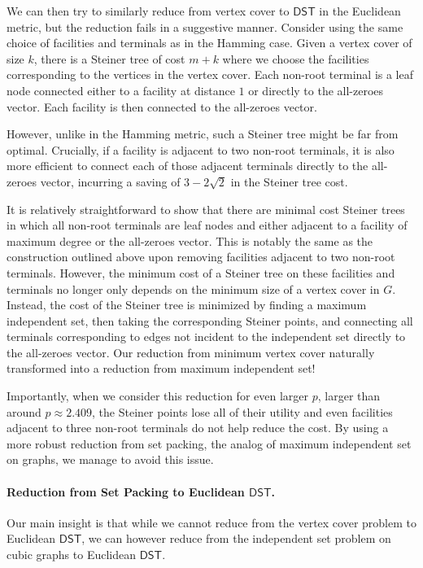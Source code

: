 \documentclass{theoretics}
\newcommand{\1}{\textbf{1}}
\newcommand{\dst}{$\mathsf{DST}$\xspace}
\begin{document}
We can then try to similarly reduce from vertex cover to \dst in the Euclidean metric, but the reduction fails in a suggestive manner. Consider using the same choice of facilities and terminals as in the Hamming case. Given a vertex cover of size $k$, there is a Steiner tree of cost $m + k$ where we choose the facilities corresponding to the vertices in the vertex cover. Each non-root terminal is a leaf node connected either to a facility at distance $1$ or directly to the all-zeroes vector. Each facility is then connected to the all-zeroes vector. 

However, unlike in the Hamming metric, such a Steiner tree might be far from optimal. Crucially, if a facility is adjacent to two non-root terminals, it is also more efficient to connect each of those adjacent terminals directly to the all-zeroes vector, incurring a saving of $3 - 2\sqrt{2}$ in the Steiner tree cost. 

It is relatively straightforward to show that there are minimal cost Steiner trees in which all non-root terminals are leaf nodes and either adjacent to a facility of maximum degree or the all-zeroes vector. This is notably the same as the construction outlined above upon removing facilities adjacent to two non-root terminals. However, the minimum cost of a Steiner tree on these facilities and terminals no longer only depends on the minimum size of a vertex cover in $G$. Instead, the cost of the Steiner tree is minimized by finding a maximum independent set, then taking the corresponding Steiner points, and connecting all terminals corresponding to edges not incident to the independent set directly to the all-zeroes vector. Our reduction from minimum vertex cover naturally transformed into a reduction from maximum independent set!

Importantly, when we consider this reduction for even larger $p$, larger than around $p \approx 2.409$, the Steiner points lose all of their utility and even facilities adjacent to three non-root terminals do not help reduce the cost. By using a more robust reduction from set packing, the analog of maximum independent set on graphs, we manage to avoid this issue.

\paragraph{\texorpdfstring{Reduction from Set Packing to Euclidean \dst.}{Reduction from Set Packing to Euclidean DST.}}
Our main insight is that while we cannot reduce from the vertex cover problem to Euclidean \dst, we can however reduce from the independent set problem on cubic graphs to Euclidean \dst.
\end{document}
